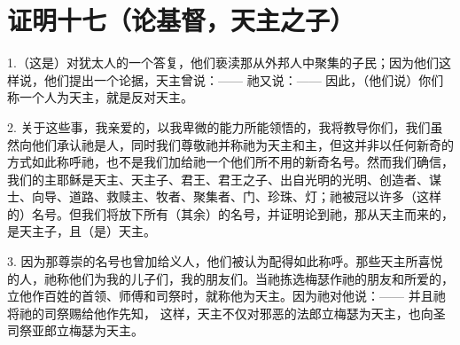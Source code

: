 

\section{证明十七（论基督，天主之子）}

1.（这是）对犹太人的一个答复，他们亵渎那从外邦人中聚集的子民；因为他们这样说，他们提出一个论据，天主曾说：——  祂又说：——  因此，（他们说）你们称一个人为天主，就是反对天主。\par

2. 关于这些事，我亲爱的，以我卑微的能力所能领悟的，我将教导你们，我们虽然向他们承认祂是人，同时我们尊敬祂并称祂为天主和主，但这并非以任何新奇的方式如此称呼祂，也不是我们加给祂一个他们所不用的新奇名号。然而我们确信，我们的主耶稣是天主、天主子、君王、君王之子、出自光明的光明、创造者、谋士、向导、道路、救赎主、牧者、聚集者、门、珍珠、灯；祂被冠以许多（这样的）名号。但我们将放下所有（其余）的名号，并证明论到祂，那从天主而来的，是天主子，且（是）天主。\par

3. 因为那尊崇的名号也曾加给义人，他们被认为配得如此称呼。那些天主所喜悦的人，祂称他们为我的儿子们，我的朋友们。当祂拣选梅瑟作祂的朋友和所爱的，立他作百姓的首领、师傅和司祭时，就称他为天主。因为祂对他说：——   并且祂将祂的司祭赐给他作先知，  这样，天主不仅对邪恶的法郎立梅瑟为天主，也向圣司祭亚郎立梅瑟为天主。\par

